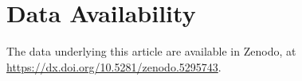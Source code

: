 \section{Data Availability}\label{sec:data_availability}
The data underlying this article are available in Zenodo, at \url{https://dx.doi.org/10.5281/zenodo.5295743}.